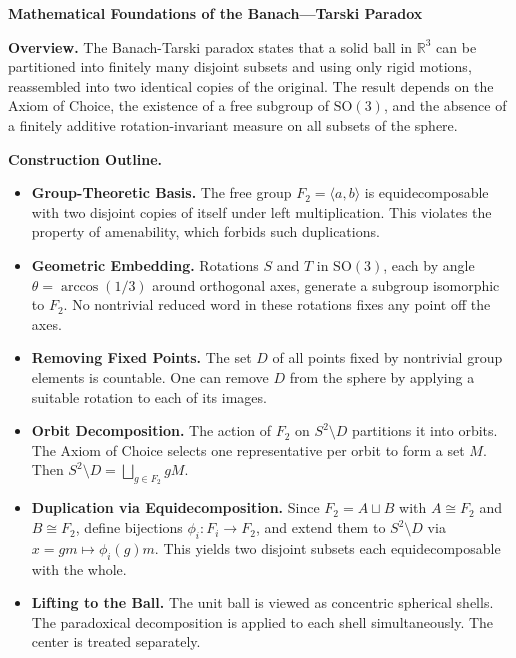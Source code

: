 \begin{technical}
{\Large\textbf{Mathematical Foundations of the Banach—Tarski Paradox}}

\textbf{Overview.}  
The Banach-Tarski paradox states that a solid ball in \(\mathbb{R}^3\) can be partitioned into finitely many disjoint subsets and using only rigid motions, reassembled into two identical copies of the original. The result depends on the Axiom of Choice, the existence of a free subgroup of \(\mathrm{SO}(3)\), and the absence of a finitely additive rotation-invariant measure on all subsets of the sphere.

\textbf{Construction Outline.}
\begin{itemize}[leftmargin=*]
    \item \textbf{Group-Theoretic Basis.}  
    The free group \(F_2 = \langle a, b \rangle\) is equidecomposable with two disjoint copies of itself under left multiplication. This violates the property of amenability, which forbids such duplications.

    \item \textbf{Geometric Embedding.}  
    Rotations \(S\) and \(T\) in \(\mathrm{SO}(3)\), each by angle \(\theta = \arccos(1/3)\) around orthogonal axes, generate a subgroup isomorphic to \(F_2\). No nontrivial reduced word in these rotations fixes any point off the axes.

    \item \textbf{Removing Fixed Points.}  
    The set \(D\) of all points fixed by nontrivial group elements is countable. One can remove \(D\) from the sphere by applying a suitable rotation to each of its images.

    \item \textbf{Orbit Decomposition.}  
    The action of \(F_2\) on \(S^2 \setminus D\) partitions it into orbits. The Axiom of Choice selects one representative per orbit to form a set \(M\). Then \(S^2 \setminus D = \bigsqcup_{g \in F_2} gM\).

    \item \textbf{Duplication via Equidecomposition.}  
    Since \(F_2 = A \sqcup B\) with \(A \cong F_2\) and \(B \cong F_2\), define bijections \(\phi_i : F_i \to F_2\), and extend them to \(S^2 \setminus D\) via \(x = gm \mapsto \phi_i(g)m\). This yields two disjoint subsets each equidecomposable with the whole.

    \item \textbf{Lifting to the Ball.}  
    The unit ball is viewed as concentric spherical shells. The paradoxical decomposition is applied to each shell simultaneously. The center is treated separately.
\end{itemize}


\end{technical}
